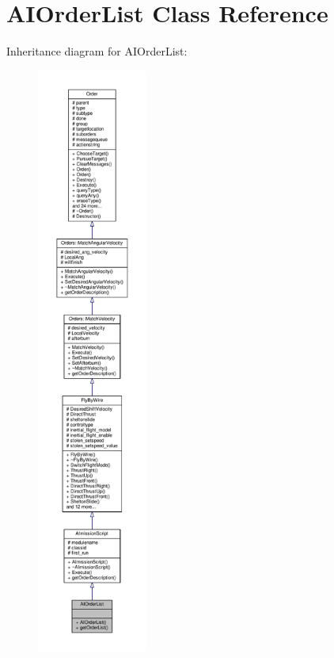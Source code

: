 \hypertarget{classAIOrderList}{}\section{A\+I\+Order\+List Class Reference}
\label{classAIOrderList}


Inheritance diagram for A\+I\+Order\+List\+:
\nopagebreak
\begin{figure}[H]
\begin{center}
\leavevmode
\includegraphics[height=550pt]{dd/d6b/classAIOrderList__inherit__graph}
\end{center}
\end{figure}


